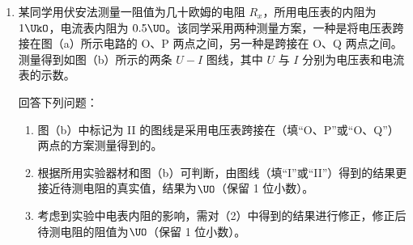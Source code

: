 \documentclass[\gkver]{gaokaozhenti}
\begin{document}
\begin{enumerate}
{$v_{2}-v_{1}=\frac{FRm_{1}}{2B^{2}L^{2}(m_{1}+m_{2})}$

大小恒定。整个运动过程用速度时间图象描述如下。


综上可得，金属框的加速度趋于恒定值，安培力也趋于恒定值，BC 选项正确；

金属框的速度会一直增大，导体棒到金属框 $bc$ 边的距离也会一直增大，AD 选项错误。

故选 BC。
}

\item
某同学用伏安法测量一阻值为几十欧姆的电阻 $R_{x}$，所用电压表的内阻为 $1\UkO$，电流表内阻为 $0.5\UO$。该同学采用两种测量方案，一种是将电压表跨接在图（a）所示电路的 O、P 两点之间，另一种是跨接在 O、Q 两点之间。测量得到如图（b）所示的两条 $U-I$ 图线，其中 $U$ 与 $I$ 分别为电压表和电流表的示数。



回答下列问题：
\begin{enumerate}
	\item
	图（b）中标记为 II 的图线是采用电压表跨接在（填“O、P”或“O、Q”）两点的方案测量得到的。

	\item
	根据所用实验器材和图（b）可判断，由图线（填“I”或“II”）得到的结果更接近待测电阻的真实值，结果为$\UO$（保留 1 位小数）。

	\item
	考虑到实验中电表内阻的影响，需对（2）中得到的结果进行修正，修正后待测电阻的阻值为$\UO$（保留 1 位小数）。
\end{enumerate}
\end{enumerate}
\end{document}
